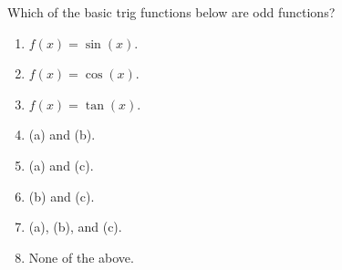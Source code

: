 \bigskip


\item Which of the basic trig functions below are odd functions?

\begin{enumerate}
\item $f(x) = \sin(x)$.
\item $f(x) = \cos(x)$.
\item $f(x) = \tan(x)$.
\item (a) and (b).
\item (a) and (c).
\item (b) and (c).
\item (a), (b), and (c).
\item None of the above.
\end{enumerate}

